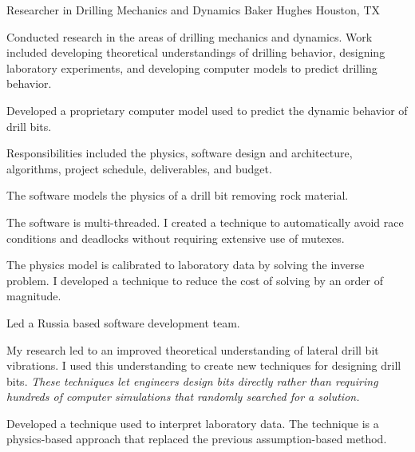 \documentclass{leresume}
\begin{document}
            {Researcher in Drilling Mechanics and Dynamics}
            {Baker Hughes}
			{Houston, TX}
			
				Conducted research in the areas of drilling mechanics and dynamics.  Work included developing theoretical understandings of drilling behavior, designing laboratory experiments, and developing computer models to predict drilling behavior.
			
		\begin{bulletedlist}
			
		\item 
					Developed a proprietary computer model used to predict the dynamic behavior of drill bits.
					
		\begin{bulletedlist}
			
		\item 
							Responsibilities included the physics, software design and architecture, algorithms, project schedule, deliverables, and budget.
						
		\item 
							The software models the physics of a drill bit removing rock material.
						
		\item 
							The software is multi-threaded.  I created a technique to automatically avoid race conditions and deadlocks without requiring extensive use of mutexes.
						
		\item 
							The physics model is calibrated to laboratory data by solving the inverse problem.  I developed a technique to reduce the cost of solving by an order of magnitude.
						
		\item Led a Russia based software development team.
		\end{bulletedlist}
	
		\item My research led to an improved theoretical understanding of lateral drill bit vibrations.  I used this understanding to create new techniques for designing drill bits.  
		\textit{These techniques let engineers design bits directly rather than requiring hundreds of computer simulations that randomly searched for a solution.}
	
		\item Developed a technique used to interpret laboratory data.  The technique is a physics-based approach that replaced the previous assumption-based method.
		\end{bulletedlist}
	
\end{document}
